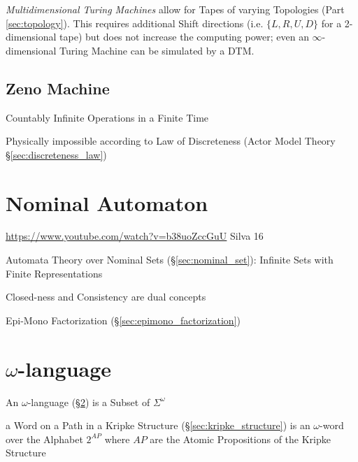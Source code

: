 \emph{Multidimensional Turing Machines} allow for Tapes of varying
Topologies (Part \ref{sec:topology}). This requires additional Shift
directions (i.e. $\{L, R, U, D\}$ for a 2-dimensional tape) but does
not increase the computing power; even an $\infty$-dimensional Turing
Machine can be simulated by a DTM.



\subsection{Zeno Machine}\label{sec:zeno_machine}

Countably Infinite Operations in a Finite Time

\fist Physically impossible according to Law of Discreteness (Actor
Model Theory \S\ref{sec:discreteness_law})



\section{Nominal Automaton}\label{sec:nominal_automaton}

\url{https://www.youtube.com/watch?v=b38uoZccGuU} Silva 16

Automata Theory over Nominal Sets (\S\ref{sec:nominal_set}): Infinite
Sets with Finite Representations

Closed-ness and Consistency are dual concepts

Epi-Mono Factorization (\S\ref{sec:epimono_factorization})



\section{$\omega$-language}\label{sec:omega_language}

An $\omega$-language (\S\ref{sec:omega_language}) is a Subset of
$\Sigma^\omega$

a Word on a Path in a Kripke Structure (\S\ref{sec:kripke_structure})
is an $\omega$-word over the Alphabet $2^{AP}$ where $AP$ are the
Atomic Propositions of the Kripke Structure

